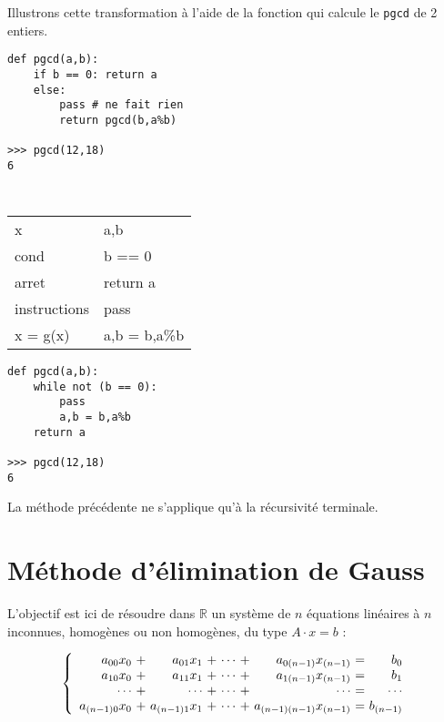 \vspace*{2mm}

\noindent Illustrons cette transformation à l'aide de la fonction qui calcule le {\tt pgcd} de 2 entiers.

\noindent\mbox{}\hspace*{1cm}\begin{py}{4cm}
\begin{verbatim}
def pgcd(a,b):
    if b == 0: return a
    else: 
        pass # ne fait rien
        return pgcd(b,a%b)

>>> pgcd(12,18)
6
\end{verbatim}
\end{py}
\hfill
\begin{py}{4cm}\tt
\begin{tabular}[t]{|l@{ $\rightarrow$ }l|}
\hline
x & a,b\\
cond & b == 0\\
arret & return a\\
instructions & {\rm pass}\\
x = g(x) & a,b = b,a\%b\\
\hline
\end{tabular}
\end{py}
\hfill
\begin{py}{4cm}
\begin{verbatim}
def pgcd(a,b):
    while not (b == 0):
        pass
        a,b = b,a%b
    return a

>>> pgcd(12,18)
6
\end{verbatim}
\end{py}

\vspace*{2mm}

La méthode précédente ne s'applique qu'à la récursivité terminale.

\section{Méthode d'élimination de {\sc Gauss}}\label{gauss}
L'objectif est ici de 
résoudre dans $\mathbb{R}$ un système de $n$ équations linéaires
à $n$ inconnues, homogènes ou non homogènes, du type $A\cdot x = b$ :

\begin{equation}\label{eq1}
\left\{
\begin{array}{r@{\ +\ }r@{\ +\ }r@{\ +\ }r@{\ =\ }r}
a_{00}x_0     & a_{01}x_1     & \cdots & a_{0(n-1)}x_{(n-1)}     & b_0      \\
a_{10}x_0     & a_{11}x_1     & \cdots & a_{1(n-1)}x_{(n-1)}     & b_1      \\
\cdots        & \cdots        & \cdots & \cdots                  & \cdots   \\
a_{(n-1)0}x_0 & a_{(n-1)1}x_1 & \cdots & a_{(n-1)(n-1)}x_{(n-1)} & b_{(n-1)}
\end{array}
\right.
\end{equation}


